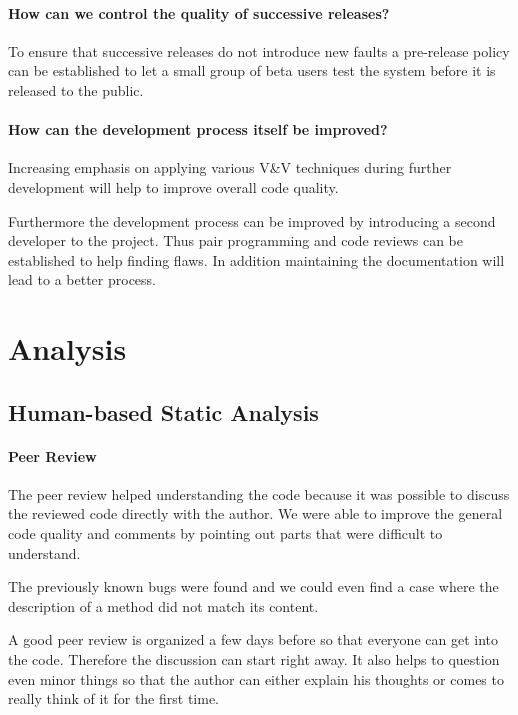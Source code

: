 \documentclass{scrartcl}
\begin{document}
\paragraph{How can we control the quality of successive releases?}

To ensure that successive releases do not introduce new faults a pre-release policy can be established to let a small group of beta users test the system before it is released to the public.

\paragraph{How can the development process itself be improved?}

Increasing emphasis on applying various V\&V techniques during further development will help to improve overall code quality. 

Furthermore the development process can be improved by introducing a second developer to the project. Thus pair programming and code reviews can be established to help finding flaws. In addition maintaining the documentation will lead to a better process.


\section{Analysis}

\subsection{Human-based Static Analysis}

\paragraph{Peer Review}

The peer review helped understanding the code because it was possible to discuss the reviewed code directly with the author.
We were able to improve the general code quality and comments by pointing out parts that were difficult to understand.

The previously known bugs were found and we could even find a case where the description of a method did not match its content.

A good peer review is organized a few days before so that everyone can get into the code. Therefore the discussion can start right away. It also helps to question even minor things so that the author can either explain his thoughts or comes to really think of it for the first time.
\end{document}
